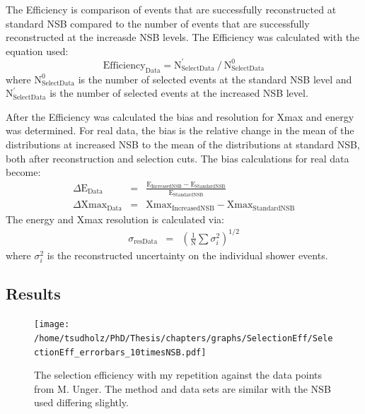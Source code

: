 The Efficiency is comparison of events that are successfully reconstructed at standard NSB compared to the number of events that are successfully reconstructed at the increasde NSB levels. The Efficiency was calculated with the equation used:
\begin{equation}
\mathrm{Efficiency}_{\mathrm{Data}} = \mathrm{N}^{'}_{\mathrm{SelectData}} \ / \ \mathrm{N}^0_{\mathrm{SelectData}}
\end{equation}
where $\mathrm{N}^{0}_{\mathrm{SelectData}}$ is the number of selected events at the standard NSB level and $\mathrm{N}^{'}_{\mathrm{SelectData}}$ is the number of selected events at the increased NSB
level. 

After the Efficiency was calculated the bias and resolution for Xmax and energy was determined. For real data, the bias is the relative change in the mean of the distributions at increased NSB to the mean of the distributions at standard NSB, both after reconstruction and selection cuts. The bias calculations for real data become:
\begin{eqnarray}
\Delta \mathrm{E}_{\mathrm{Data}} &=& \frac{\mathrm{E}_{\mathrm{IncreasedNSB}} - \mathrm{E}_{\mathrm{StandardNSB}}}{\mathrm{E}_{\mathrm{StandardNSB}}} \label{eq:energybias_data} \\
\Delta \mathrm{Xmax}_{\mathrm{Data}} &=& \mathrm{Xmax}_{\mathrm{IncreasedNSB}} - \mathrm{Xmax}_{\mathrm{StandardNSB}}\label{eq:xmaxbias_data}
\end{eqnarray} 
The energy and Xmax resolution is calculated via:
\begin{eqnarray}
\sigma_{\mathrm{resData}} &=& \left( \frac{1}{\mathrm{N}} \sum \sigma^2_i \right)^{1/2}
\end{eqnarray}
where $\sigma^2_i$ is the reconstructed uncertainty on the individual shower events.

\subsection{Results}

\begin{figure}
\centering
\texttt{[image: /home/tsudholz/PhD/Thesis/chapters/graphs/SelectionEff/SelectionEff\_errorbars\_10timesNSB.pdf]}
\caption{The selection efficiency with my repetition against the data points from M. Unger. The method and data sets are similar with the NSB used differing slightly.}
\end{figure}

